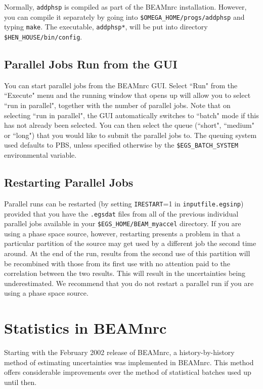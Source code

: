 \documentclass[12pt,twoside]{article}
\begin{document}
Normally, {\tt addphsp} is compiled as part of the BEAMnrc installation.
However, you can compile it separately by going into
{\tt \$OMEGA\_HOME/progs/addphsp} and typing {\tt make}.  The
executable, {\tt addphsp*}, will be put into directory
{\tt \$HEN\_HOUSE/bin/config}.

\subsection{Parallel Jobs Run from the GUI}

You can start parallel jobs from the BEAMnrc GUI.  Select ``Run" from
the ``Execute" menu and the running window that opens up will allow
you to select ``run in parallel", together with the number of parallel
jobs.  Note that on selecting ``run in parallel", the GUI automatically
switches to ``batch" mode if this has not already been selected.  You can
then select the queue (``short", ``medium" or ``long") that you would
like to submit the parallel jobs to.  The queuing system used defaults
to PBS, unless specified otherwise by the {\tt \$EGS\_BATCH\_SYSTEM}
environmental variable.

\subsection{Restarting Parallel Jobs}

Parallel runs can be restarted (by setting {\tt IRESTART}=1 in
{\tt inputfile.egsinp}) provided that you have the {\tt .egsdat} files
from all of the previous individual parallel jobs available in your
{\tt \$EGS\_HOME/BEAM\_myaccel} directory.  If you are using a
phase space source, however, restarting presents a problem in that a
particular partition of the source may get used by a different job the
second time around.  At the end of the run, results from the second
use of this partition will be recombined with those from its first use
with no attention paid to the correlation between the two results.  This
will result in the uncertainties being underestimated.  We recommend that
you do not restart a parallel run if you are using a phase space source.

\section{Statistics in BEAMnrc}

Starting with the February 2002 release of BEAMnrc, a history-by-history
method of estimating uncertainties was implemented in BEAMnrc\cite{Wa02a}.
This method offers considerable improvements over the method of
statistical batches used up until then.
\end{document}
